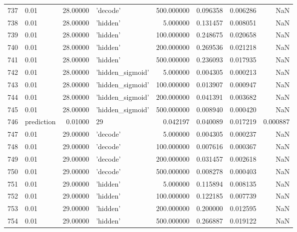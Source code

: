 \documentclass[10pt,a4paper]{article}
\begin{document}
\begin{tabular}{llrlrrrr}
737  &        0.01 &  28.00000 &           'decode' &  500.000000 &  0.096358 &  0.006286 &       NaN \\
738  &        0.01 &  28.00000 &           'hidden' &    5.000000 &  0.131457 &  0.008051 &       NaN \\
739  &        0.01 &  28.00000 &           'hidden' &  100.000000 &  0.248675 &  0.020658 &       NaN \\
740  &        0.01 &  28.00000 &           'hidden' &  200.000000 &  0.269536 &  0.021218 &       NaN \\
741  &        0.01 &  28.00000 &           'hidden' &  500.000000 &  0.236093 &  0.017935 &       NaN \\
742  &        0.01 &  28.00000 &   'hidden\_sigmoid' &    5.000000 &  0.004305 &  0.000213 &       NaN \\
743  &        0.01 &  28.00000 &   'hidden\_sigmoid' &  100.000000 &  0.013907 &  0.000947 &       NaN \\
744  &        0.01 &  28.00000 &   'hidden\_sigmoid' &  200.000000 &  0.041391 &  0.003682 &       NaN \\
745  &        0.01 &  28.00000 &   'hidden\_sigmoid' &  500.000000 &  0.008940 &  0.000420 &       NaN \\
746  &  prediction &   0.01000 &                 29 &    0.042197 &  0.040089 &  0.017219 &  0.000887 \\
747  &        0.01 &  29.00000 &           'decode' &    5.000000 &  0.004305 &  0.000237 &       NaN \\
748  &        0.01 &  29.00000 &           'decode' &  100.000000 &  0.007616 &  0.000367 &       NaN \\
749  &        0.01 &  29.00000 &           'decode' &  200.000000 &  0.031457 &  0.002618 &       NaN \\
750  &        0.01 &  29.00000 &           'decode' &  500.000000 &  0.008278 &  0.000403 &       NaN \\
751  &        0.01 &  29.00000 &           'hidden' &    5.000000 &  0.115894 &  0.008135 &       NaN \\
752  &        0.01 &  29.00000 &           'hidden' &  100.000000 &  0.122185 &  0.007739 &       NaN \\
753  &        0.01 &  29.00000 &           'hidden' &  200.000000 &  0.200000 &  0.012595 &       NaN \\
754  &        0.01 &  29.00000 &           'hidden' &  500.000000 &  0.266887 &  0.019122 &       NaN \\

\end{tabular}
\end{document}
